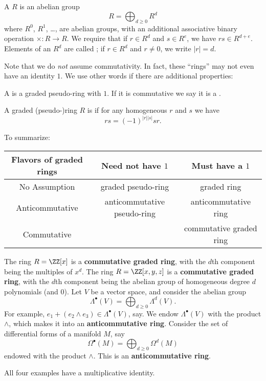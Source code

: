 \begin{definition}
	A  $R$ is an abelian group
	\[ R = \bigoplus_{d \ge 0} R^d \]
	where $R^0$, $R^1$, \dots, are abelian groups,
	with an additional associative binary operation $\times : R \to R$.
	We require that if $r \in R^d$ and $s \in R^e$, we have $rs \in R^{d+e}$.
	Elements of an $R^d$ are called ;
	if $r \in R^d$ and $r \neq 0$, we write $|r| = d$.
\end{definition}
Note that we do \emph{not} assume commutativity.
In fact, these ``rings'' may not even have an identity $1$.
We use other words if there are additional properties:
\begin{definition}
	A  is a graded pseudo-ring with $1$.
	If it is commutative we say it is a .
\end{definition}
\begin{definition}
	A graded (pseudo-)ring $R$ is  if
	for any homogeneous $r$ and $s$ we have
	\[ rs = (-1)^{|r| |s|} sr. \]
\end{definition}

To summarize:
\begin{center}
	\small
	\begin{tabular}[h]{|c|cc|}
		\hline
		\textbf{Flavors of graded rings} &
		Need not have $1$ & Must have a $1$ \\ \hline
		No Assumption & graded pseudo-ring & graded ring \\
		Anticommutative & anticommutative pseudo-ring & anticommutative ring \\
		Commutative &  & commutative graded ring \\ \hline
	\end{tabular}
\end{center}

\begin{example}
	\listhack
	\begin{enumerate}[(a)]
		\ii The ring $R = \ZZ[x]$ is a \textbf{commutative graded ring},
		with the $d$th component being the multiples of $x^d$.
		\ii The ring $R = \ZZ[x,y,z]$ is a \textbf{commutative graded ring},
		with the $d$th component being the abelian group
		of homogeneous degree $d$ polynomials (and $0$).
		\ii Let $V$ be a vector space, and consider
		the abelian group
		\[ \Lambda^\bullet(V) = \bigoplus_{d \ge 0} \Lambda^d(V). \]
		For example, $e_1 + (e_2 \wedge e_3) \in \Lambda^\bullet(V)$, say.
		We endow $\Lambda^\bullet(V)$ with the product $\wedge$,
		which makes it into an \textbf{anticommutative ring}.
		\ii Consider the set of differential forms of a manifold $M$,
		say \[ \Omega^\bullet(M) = \bigoplus_{d \ge 0} \Omega^d(M) \]
		endowed with the product $\wedge$.
		This is an \textbf{anticommutative ring}.
	\end{enumerate}
	All four examples have a multiplicative identity.
\end{example}

